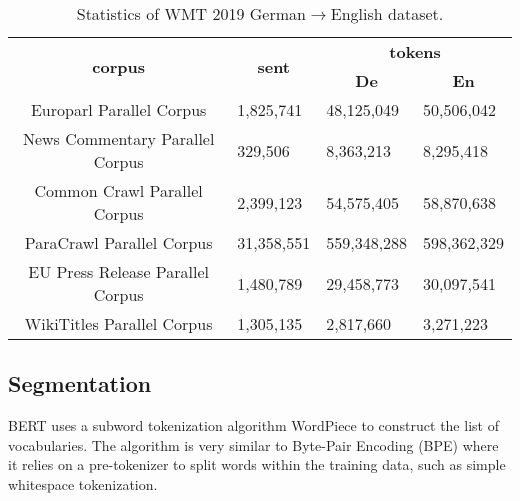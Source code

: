 \begin{table}[h]
    \centering
    \begin{tabular}{@{}clll@{}}
        \toprule
        \multirow{2}{*}{\textbf{corpus}} & \multicolumn{1}{c}{\multirow{2}{*}{\textbf{sent}}} & \multicolumn{2}{c}{\textbf{tokens}}                                   \\
                                         & \multicolumn{1}{c}{}                               & \multicolumn{1}{c}{\textbf{De}}     & \multicolumn{1}{c}{\textbf{En}} \\ \midrule
        Europarl Parallel Corpus         & 1,825,741                                          & 48,125,049                          & 50,506,042                      \\
        News Commentary Parallel Corpus  & 329,506                                            & 8,363,213                           & 8,295,418                       \\
        Common Crawl Parallel Corpus     & 2,399,123                                          & 54,575,405                          & 58,870,638                      \\
        ParaCrawl Parallel Corpus        & 31,358,551                                         & 559,348,288                         & 598,362,329                     \\
        EU Press Release Parallel Corpus & 1,480,789                                          & 29,458,773                          & 30,097,541                      \\
        WikiTitles Parallel Corpus       & 1,305,135                                          & 2,817,660                           & 3,271,223                       \\ \bottomrule
    \end{tabular}
    \caption{Statistics of WMT 2019 German$\rightarrow$English dataset.}
    \label{tab:wmt19stat}
\end{table}

\subsection{Segmentation}
BERT uses a subword tokenization algorithm WordPiece \cite{schuster2012japanese} to construct the list of vocabularies. The algorithm is very similar to Byte-Pair Encoding (BPE) \cite{sennrich-etal-2016-neural} where it relies on a pre-tokenizer to split words within the training data, such as simple whitespace tokenization.

